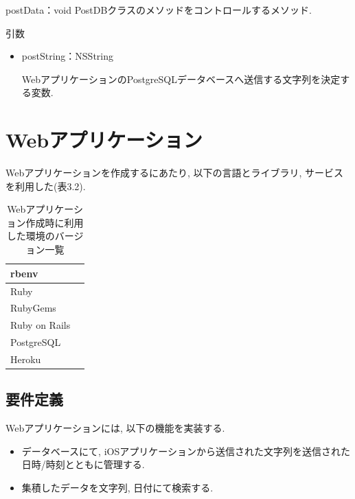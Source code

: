 \begin{description}
\begin{itemize}
\begin{itembox}[l]{postData：void}
PostDBクラスのメソッドをコントロールするメソッド.

\begin{itembox}[l]{引数}
\begin{itemize}
\item postString：NSString

WebアプリケーションのPostgreSQLデータベースへ送信する文字列を決定する変数.
\end{itemize}
\end{itembox}
\end{itembox}

\end{itemize}

\end{description}

\section{Webアプリケーション}
Webアプリケーションを作成するにあたり, 以下の言語とライブラリ, サービスを利用した(表3.2).

\begin{table}
\begin{center}
\begin{tabular}{|l|l|} \hline
rbenv & \\ \hline
Ruby & \\ \hline
RubyGems & \\ \hline
Ruby on Rails & \\ \hline
PostgreSQL & \\ \hline
Heroku & \\ \hline
\end{tabular}
\end{center}
\caption{Webアプリケーション作成時に利用した環境のバージョン一覧}
\end{table}

\subsection{要件定義}
Webアプリケーションには, 以下の機能を実装する.

\begin{screen}
\begin{itemize}
\item データベースにて, iOSアプリケーションから送信された文字列を送信された日時/時刻とともに管理する.

\item 集積したデータを文字列, 日付にて検索する.
\end{itemize}
\end{screen}

